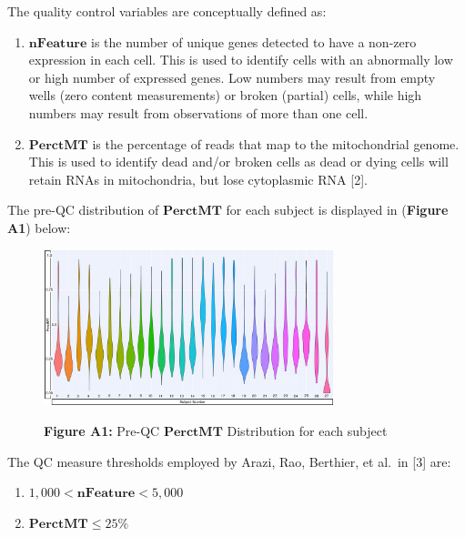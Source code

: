 \documentclass[12pt,]{article}
\providecommand{\tightlist}{%
  \setlength{\itemsep}{0pt}\setlength{\parskip}{0pt}}
\begin{document}
The quality control variables are conceptually defined as:

\begin{enumerate}
\def\labelenumi{\arabic{enumi}.}
\tightlist
\item
  \underline{$\mathbf{nFeature}$} is the number of unique genes detected
  to have a non-zero expression in each cell. This is used to identify
  cells with an abnormally low or high number of expressed genes. Low
  numbers may result from empty wells (zero content measurements) or
  broken (partial) cells, while high numbers may result from
  observations of more than one cell.
\item
  \underline{$\mathbf{PerctMT}$} is the percentage of reads that map to
  the mitochondrial genome. This is used to identify dead and/or broken
  cells as dead or dying cells will retain RNAs in mitochondria, but
  lose cytoplasmic RNA {[}2{]}.
\end{enumerate}

The pre-QC distribution of \(\mathbf{PerctMT}\) for each subject is
displayed in (\textbf{Figure A1}) below:

\newpage

\begin{figure}[!h]
\centering
        \includegraphics[width=0.75\textwidth]{fig1.jpeg}
\vspace{5pt}
\begin{center}
\textbf{Figure A1:} Pre-QC $\mathbf{PerctMT}$ Distribution for each subject
\end{center}
\end{figure}

The QC measure thresholds employed by Arazi, Rao, Berthier, et al.~in
{[}3{]} are:

\begin{enumerate}
\def\labelenumi{\arabic{enumi}.}
\tightlist
\item
  \(1,000 < \mathbf{nFeature} < 5,000\)
\item
  \(\mathbf{PerctMT} \leq 25 \%\)
\end{enumerate}
\end{document}
